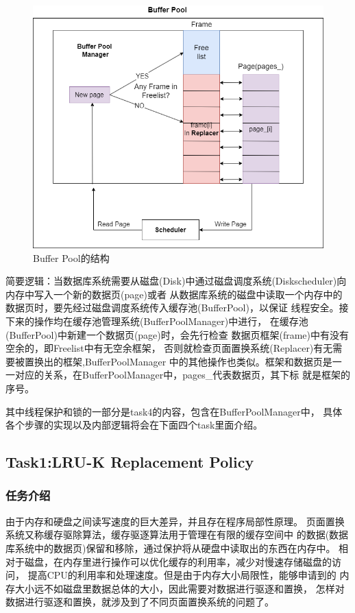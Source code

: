 \documentclass[a4paper]{article}
\begin{document}
\begin{figure}[h!]
   \centering
   \includegraphics[scale=0.5]{1.png}
   \caption{Buffer Pool的结构}
   \label{fig:1}
\end{figure}

简要逻辑：当数据库系统需要从磁盘(Disk)中通过磁盘调度系统(Diskscheduler)向内存中写入一个新的数据页(page)或者
从数据库系统的磁盘中读取一个内存中的数据页时，要先经过磁盘调度系统传入缓存池(BufferPool)，以保证
线程安全。接下来的操作均在缓存池管理系统(BufferPoolManager)中进行，
在缓存池(BufferPool)中新建一个数据页(page)时，会先行检查
数据页框架(frame)中有没有空余的，即Freelist中有无空余框架，
否则就检查页面置换系统(Replacer)有无需要被置换出的框架,BufferPoolManager
中的其他操作也类似。框架和数据页是一一对应的关系，在BufferPoolManager中，pages\_代表数据页，其下标
就是框架的序号。

其中线程保护和锁的一部分是task4的内容，包含在BufferPoolManager中，
具体各个步骤的实现以及内部逻辑将会在下面四个task里面介绍。

\subsection{Task1:LRU-K Replacement Policy}

\subsubsection{任务介绍}

由于内存和硬盘之间读写速度的巨大差异，并且存在程序局部性原理。
页面置换系统又称缓存驱除算法，缓存驱逐算法用于管理在有限的缓存空间中
的数据(数据库系统中的数据页)保留和移除，通过保护将从硬盘中读取出的东西在内存中。
相对于磁盘，在内存里进行操作可以优化缓存的利用率，减少对慢速存储磁盘的访问，
提高CPU的利用率和处理速度。但是由于内存大小局限性，能够申请到的
内存大小远不如磁盘里数据总体的大小，因此需要对数据进行驱逐和置换，
怎样对数据进行驱逐和置换，就涉及到了不同页面置换系统的问题了。
\end{document}
